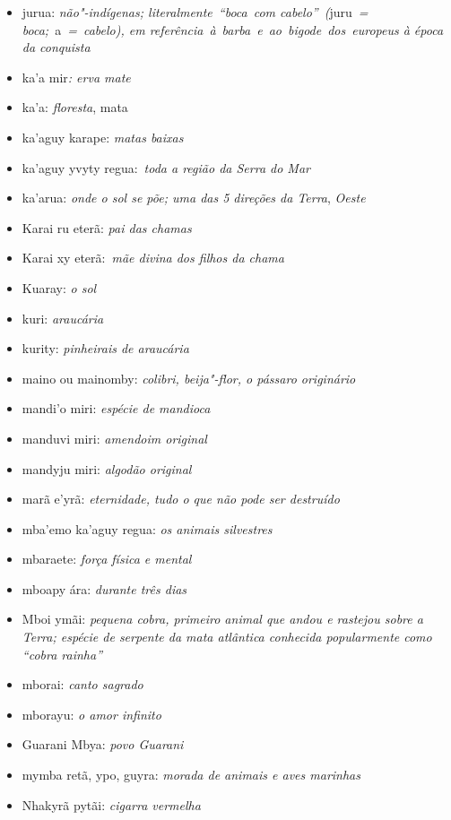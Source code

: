 \begin{itemize}
\item
  jurua: \emph{não"-indígenas; literalmente}~\emph{``boca}~\emph{com
  cabelo''}~\emph{(}juru~\emph{= boca;}~a~\emph{=}~\emph{cabelo), em
  referência}~\emph{à}~\emph{barba}~\emph{e}~\emph{ao}~\emph{bigode}~\emph{dos}~\emph{europeus
  à época da conquista}~
\item
  ka'a mir\emph{: erva mate}
\item
  ka'a: \emph{floresta}, mata
\item
  ka'aguy karape: \emph{matas baixas}
\item
  ka'aguy yvyty regua:~\emph{toda a região da Serra do Mar}~
\item
  ka'arua: \emph{onde o sol se põe; uma das 5 direções da Terra},
  \emph{Oeste}~
\item
  Karai ru eterã: \emph{pai das chamas}
\item
  Karai xy eterã:~\emph{mãe divina dos filhos da chama}
\item
  Kuaray: \emph{o sol}
\item
  kuri: \emph{araucária}
\item
  kurity: \emph{pinheirais de araucária}
\item
  maino ou mainomby: \emph{colibri, beija"-flor, o pássaro originário}
\item
  mandi'o miri: \emph{espécie de mandioca}
\item
  manduvi miri: \emph{amendoim original}
\item
  mandyju miri: \emph{algodão original}
\item
  marã e'yrã: \emph{eternidade, tudo o que não pode ser destruído}
\item
  mba'emo ka'aguy regua: \emph{os animais silvestres}
\item
  mbaraete: \emph{força física e mental}
\item
  mboapy ára: \emph{durante três dias}
\item
  Mboi ymãi: \emph{pequena cobra, primeiro animal que andou e rastejou
  sobre a Terra; espécie de serpente da mata atlântica conhecida
  popularmente como ``cobra rainha''}
\item
  mborai: \emph{canto sagrado}
\item
  mborayu: \emph{o amor infinito}
\item
  Guarani Mbya: \emph{povo Guarani}
\item
  mymba retã, ypo, guyra: \emph{morada de animais e aves marinhas}
\item
  Nhakyrã pytãi: \emph{cigarra vermelha}

\end{itemize}
